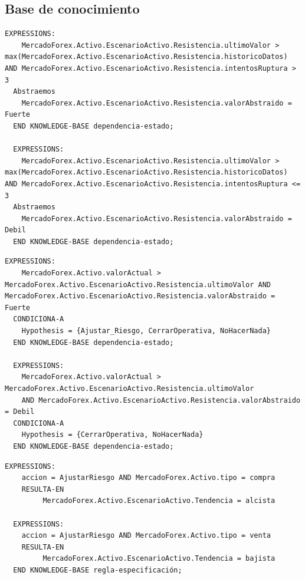 \subsection{Base de conocimiento}
\begin{lstlisting}[style=Python-color, caption={regla-abstraccion}]
  EXPRESSIONS:
    MercadoForex.Activo.EscenarioActivo.Resistencia.ultimoValor > max(MercadoForex.Activo.EscenarioActivo.Resistencia.historicoDatos) AND MercadoForex.Activo.EscenarioActivo.Resistencia.intentosRuptura > 3
  Abstraemos
    MercadoForex.Activo.EscenarioActivo.Resistencia.valorAbstraido = Fuerte
  END KNOWLEDGE-BASE dependencia-estado;
  
  EXPRESSIONS:
    MercadoForex.Activo.EscenarioActivo.Resistencia.ultimoValor > max(MercadoForex.Activo.EscenarioActivo.Resistencia.historicoDatos) AND MercadoForex.Activo.EscenarioActivo.Resistencia.intentosRuptura <= 3
  Abstraemos
    MercadoForex.Activo.EscenarioActivo.Resistencia.valorAbstraido = Debil
  END KNOWLEDGE-BASE dependencia-estado;
\end{lstlisting}

\begin{lstlisting}[style=Python-color, caption={dependencia-estado}]
  EXPRESSIONS:
    MercadoForex.Activo.valorActual > MercadoForex.Activo.EscenarioActivo.Resistencia.ultimoValor AND MercadoForex.Activo.EscenarioActivo.Resistencia.valorAbstraido = Fuerte
  CONDICIONA-A
    Hypothesis = {Ajustar_Riesgo, CerrarOperativa, NoHacerNada}
  END KNOWLEDGE-BASE dependencia-estado;
    
  EXPRESSIONS:
    MercadoForex.Activo.valorActual > MercadoForex.Activo.EscenarioActivo.Resistencia.ultimoValor
    AND MercadoForex.Activo.EscenarioActivo.Resistencia.valorAbstraido = Debil
  CONDICIONA-A
    Hypothesis = {CerrarOperativa, NoHacerNada}
  END KNOWLEDGE-BASE dependencia-estado;
\end{lstlisting}
    
\begin{lstlisting}[style=Python-color, caption={regla-especificación}]
  EXPRESSIONS:
    accion = AjustarRiesgo AND MercadoForex.Activo.tipo = compra
    RESULTA-EN
         MercadoForex.Activo.EscenarioActivo.Tendencia = alcista

  EXPRESSIONS:
    accion = AjustarRiesgo AND MercadoForex.Activo.tipo = venta
    RESULTA-EN
         MercadoForex.Activo.EscenarioActivo.Tendencia = bajista
  END KNOWLEDGE-BASE regla-especificación;
\end{lstlisting}
      
